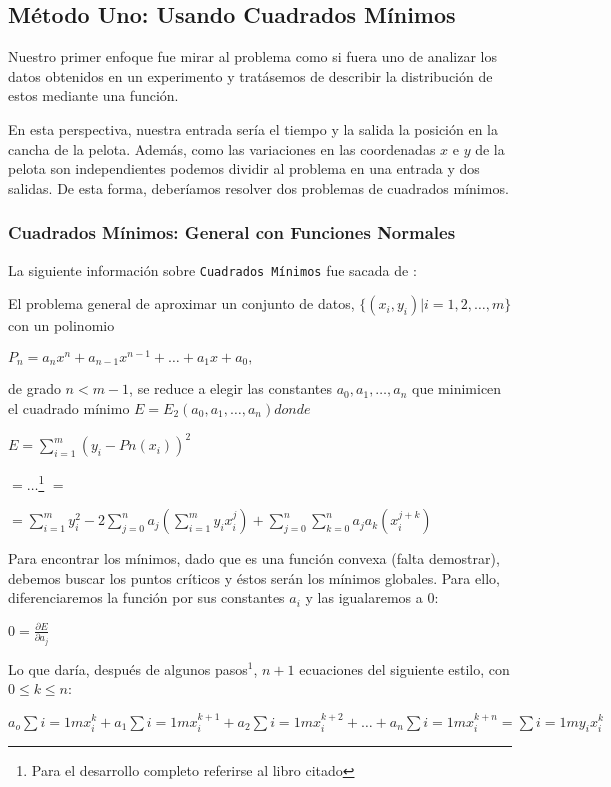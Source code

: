 \subsection{Método Uno: Usando Cuadrados Mínimos}
Nuestro primer enfoque fue mirar al problema como si fuera uno de analizar los datos obtenidos en un
experimento y tratásemos de describir la distribución de estos mediante una función.

En esta perspectiva, nuestra entrada sería el tiempo y la salida la posición en la cancha de la
pelota. Además, como las variaciones en las coordenadas $x$ e $y$ de la pelota son independientes
podemos dividir al problema en una entrada y dos salidas. De esta forma, deberíamos resolver dos
problemas de cuadrados mínimos.

\subsubsection{Cuadrados Mínimos: General con Funciones Normales}
La siguiente información sobre \texttt{Cuadrados Mínimos} fue sacada de \cite[p~501]{burden}:

El problema general de aproximar un conjunto de datos, $\{(x_i, y_i) | i = 1,2, \ldots, m\}$ con un
polinomio
\begin{center}
  $P_n = a_n x^n + a_{n-1}x^{n-1}+ \hdots + a_1x+a_0,   $
\end{center}
de grado $n < m-1$, se reduce a elegir las constantes $a_0, a_1, \ldots, a_n$ que minimicen el
cuadrado mínimo $E = E_2(a_0, a_1,\ldots, a_n) donde$
\begin{center}
  $E = \sum_{i=1}^{m} (y_i - Pn(x_i))^2$

  $= \ldots  $\footnote{Para el desarrollo completo referirse al libro citado} $=$

  $ = \sum_{i=1}^{m} y_i^2 -2 \sum_{j=0}^{n} a_j \left(\sum_{i=1}^{m} y_i x_i^j \right) + 
    \sum_{j=0}^{n} \sum_{k=0}^{n} a_j a_k \left(x_i^{j+k}\right)$
\end{center}

Para encontrar los mínimos, dado que es una función convexa (falta demostrar), debemos buscar los
puntos críticos y éstos serán los mínimos globales. Para ello, diferenciaremos la función por sus
constantes $a_i$ y las igualaremos a 0:
\begin{center}
  $0 =  \frac{\partial E}{\partial a_j}$
\end{center}
Lo que daría, después de algunos pasos$^1$, $n+1$ ecuaciones del siguiente estilo, con $0 \leq k
\leq n$:
\begin{center}
  $a_o \sum{i=1}{m} x_i^{k} + a_1 \sum{i=1}{m} x_i^{k+1}+ a_2 \sum{i=1}{m} x_i^{k+2} + \hdots +
   a_n \sum{i=1}{m} x_i^{k+n} =   \sum{i=1}{m} y_i x_i^k$
\end{center}

